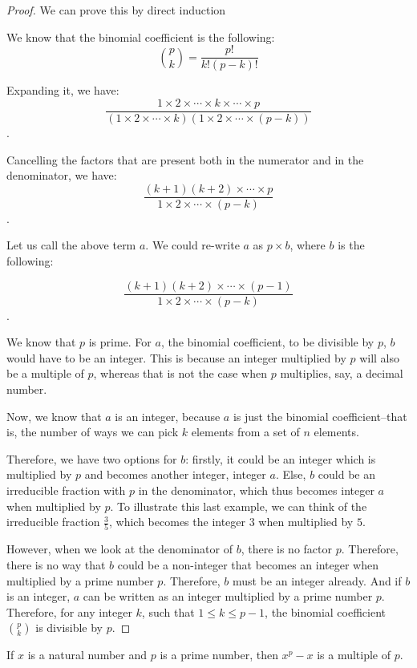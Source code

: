 \documentclass[11pt,reqno,oneside,a4paper]{article}
\begin{document}
\begin{proof}
We can prove this by direct induction

We know that the binomial coefficient is the following:
$$\binom{p}{k} = \frac{p!}{k!(p-k)!}$$

Expanding it, we have:
$$\frac{1 \times 2 \times \cdots \times k \times \cdots \times p}{(1 \times 2 \times \cdots \times k)(1 \times 2 \times \cdots \times (p-k))}$$.

Cancelling the factors that are present both in the numerator and in the denominator, we have:
$$\frac{(k+1)(k+2) \times \cdots \times p}{1 \times 2 \times \cdots \times (p-k)}$$.

Let us call the above term $a$. We could re-write $a$ as $p \times b$, where $b$ is the following:

$$\frac{(k+1)(k+2)\times \cdots \times (p-1)}{1 \times 2 \times \cdots \times (p-k)}$$.

We know that $p$ is prime. For $a$, the binomial coefficient, to be divisible by $p$, $b$ would have to be an integer. This is because an integer multiplied by $p$ will also be a multiple of $p$, whereas that is not the case when $p$ multiplies, say, a decimal number.
 
Now, we know that $a$ is an integer, because $a$ is just the binomial coefficient--that is, the number of ways we can pick $k$ elements from a set of $n$ elements.

Therefore, we have two options for $b$: firstly, it could be an integer which is multiplied by $p$ and becomes another integer, integer $a$. Else, $b$ could be an irreducible fraction with $p$ in the denominator, which thus becomes integer $a$ when multiplied by $p$. To illustrate this last example, we can think of the irreducible fraction $\frac{3}{5}$, which becomes the integer $3$ when multiplied by $5$.

However, when we look at the denominator of $b$, there is no factor $p$. Therefore, there is no way that $b$ could be a non-integer that becomes an integer when multiplied by a prime number $p$. Therefore, $b$ must be an integer already. And if $b$ is an integer, $a$ can be written as an integer multiplied by a prime number $p$. Therefore, for any integer $k$, such that $1 \leq k \leq p - 1$, the binomial coefficient $\binom{p}{k}$ is divisible by $p$.

\end{proof}


\begin{thm} \label{thm:FermatLittle}
	If $x$ is a natural number and $p$ is a prime number, then $x^p - x$ is a multiple of $p$.
\end{thm}
\end{document}
